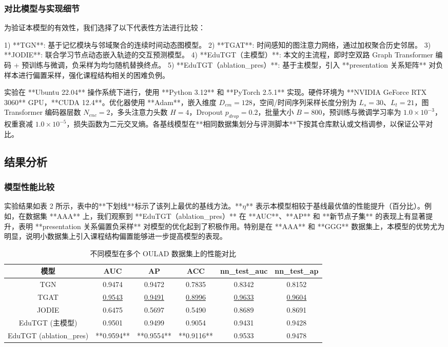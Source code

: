 \subsubsection{对比模型与实现细节}

为验证本模型的有效性，我们选择了以下代表性方法进行比较：

1) **TGN**: 基于记忆模块与邻域聚合的连续时间动态图模型。  
2) **TGAT**: 时间感知的图注意力网络，通过加权聚合历史邻居。  
3) **JODIE**: 联合学习节点动态嵌入轨迹的交互预测模型。  
4) **EduTGT（主模型）**: 本文的主流程，即时空双路 Graph Transformer 编码 + 预训练与微调，负采样为均匀随机替换终点。  
5) **EduTGT（ablation\_pres）**: 基于主模型，引入 **presentation 关系矩阵** 对负样本进行偏置采样，强化课程结构相关的困难负例。

实验在 **Ubuntu 22.04** 操作系统下进行，使用 **Python 3.12** 和 **PyTorch 2.5.1** 实现。硬件环境为 **NVIDIA GeForce RTX 3060** GPU，**CUDA 12.4**。优化器使用 **Adam**，嵌入维度 \(D_{em}=128\)，空间/时间序列采样长度分别为 \(L_s=30\)、\(L_t=21\)，图 Transformer 编码器层数 \(N_{enc}=2\)，多头注意力头数 \(H=4\)，Dropout \(p_{drop}=0.2\)，批量大小 \(B=800\)，预训练与微调学习率为 \(1.0\times 10^{-3}\)，权重衰减 \(1.0\times 10^{-5}\)，损失函数为二元交叉熵。各基线模型在**相同数据集划分与评测脚本**下按其仓库默认或文档调参，以保证公平对比。

\subsection{结果分析}

\subsubsection{模型性能比较}

实验结果如表 2 所示，表中的**下划线**标示了该列上最优的基线方法。**\(\eta\)** 表示本模型相较于基线最优值的性能提升（百分比）。例如，在数据集 **AAA** 上，我们观察到 **EduTGT（ablation\_pres）** 在 **AUC**、**AP** 和 **新节点子集** 的表现上有显著提升，表明 **presentation 关系偏置负采样** 对模型的优化起到了积极作用。特别是在 **AAA** 和 **GGG** 数据集上，本模型的优势尤为明显，说明小数据集上引入课程结构偏置能够进一步提高模型的表现。

\begin{table}[ht]
\centering
\caption{不同模型在多个 OULAD 数据集上的性能对比}
\begin{tabular}{|c|c|c|c|c|c|}
\hline
模型 & AUC & AP & ACC & nn\_test\_auc & nn\_test\_ap \\
\hline
TGN & 0.9474 & 0.9472 & 0.7835 & 0.8342 & 0.8152 \\
TGAT & \underline{0.9543} & \underline{0.9491} & \underline{0.8996} & \underline{0.9633} & \underline{0.9604} \\
JODIE & 0.6475 & 0.5697 & 0.5490 & 0.8689 & 0.8691 \\
EduTGT (主模型) & 0.9501 & 0.9499 & 0.9054 & 0.9431 & 0.9428 \\
EduTGT (ablation\_pres) & **0.9594** & **0.9554** & **0.9116** & 0.9533 & 0.9478 \\
\hline
\end{tabular}
\end{table}

